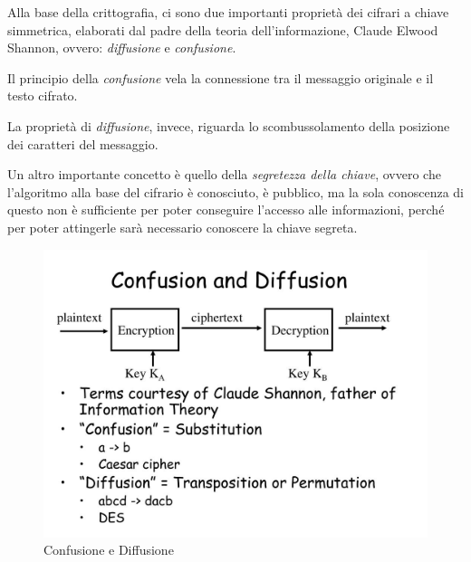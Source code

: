     

\textsf{\small Alla base della crittografia, ci sono due importanti proprietà dei cifrari a chiave simmetrica, elaborati dal padre della teoria dell'informazione, Claude Elwood Shannon, ovvero: \emph{diffusione} e \emph{confusione}.} \\

\textsf{\small Il principio della \emph{confusione} vela la connessione tra il messaggio originale e il testo cifrato.} %

\textsf{\small La proprietà di \emph{diffusione}, invece, riguarda lo scombussolamento della posizione dei caratteri del messaggio.} %


\textsf{\small Un altro importante concetto è quello della \emph{segretezza della chiave}, ovvero che l'algoritmo alla base del cifrario è conosciuto, è pubblico, ma la sola conoscenza di questo non è sufficiente per poter conseguire l'accesso alle informazioni, perché per poter attingerle sarà necessario conoscere la chiave segreta.} %

\begin{figure}[H]
	\centering
	\includegraphics[width=1\textwidth, height=1\textheight, keepaspectratio]{./images/theory_of_information/confusion-and-diffusion.png}
	\caption{Confusione e Diffusione}
	\label{fig:confusion_and_diffusion}
\end{figure}

